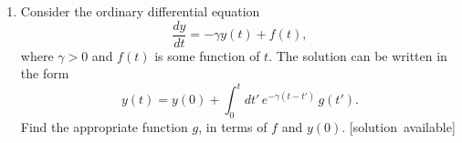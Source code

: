 \documentclass[10pt,a4paper]{article}
\begin{document}
\begin{enumerate}
\item
  Consider the ordinary differential equation
  \begin{equation}
    \frac{dy}{dt} = - \gamma y(t) + f(t),
  \end{equation}
  where $\gamma > 0$ and $f(t)$ is some function of $t$. The solution
  can be written in the form
  \begin{equation}
    y(t) = y(0) + \int_0^t dt' \, e^{-\gamma(t-t')} \, g(t').
  \end{equation}
  Find the appropriate function $g$, in terms of $f$ and $y(0)$.
  \hfill{\scriptsize [solution~available]}
\end{enumerate}
\end{document}

